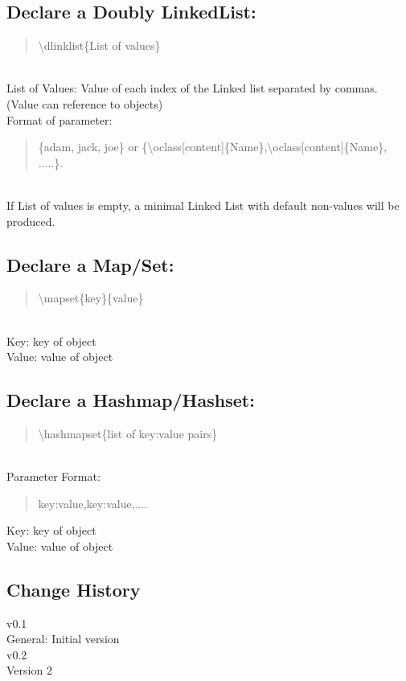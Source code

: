 \documentclass[10pt,a4paper,english]{article}
\begin{document}
\begin{flushleft}
\subsection*{Declare a Doubly LinkedList:}
\begin{quote}{\ttfamily \raggedright \noindent
{\textbackslash}dlinklist{\{}List of values{\}} 
}\end{quote}
~\\ \medskip
List of Values: Value of each index of the Linked list separated by commas. (Value can reference to objects) 
~\\ \medskip
Format of parameter:
~\\
\begin{quote}{\ttfamily \raggedright \noindent
{\{}adam, jack, joe{\}} or {\{}{\textbackslash}oclass[content]{\{}Name{\}},{\textbackslash}oclass[content]{\{}Name{\}}, .....{\}}. 
}\end{quote}
~\\
If List of values is empty, a minimal Linked List with default non-values will be produced.

\subsection*{Declare a Map/Set:}
\begin{quote}{\ttfamily \raggedright \noindent
{\textbackslash}mapset{\{}key{\}}{\{}value{\}} 
}\end{quote}
~\\ \medskip
Key:  key of object ~\\
Value: value of object ~\\

\subsection*{Declare a Hashmap/Hashset:}
\begin{quote}{\ttfamily \raggedright \noindent
{\textbackslash}hashmapset{\{}list of key:value pairs{\}}
}\end{quote}
~\\ \medskip
Parameter Format:~\\ \medskip
\begin{quote}{\ttfamily \raggedright \noindent
{ {key:value},{key:value},....}
}\end{quote}
Key:  key of object ~\\
Value: value of object ~\\

\end{flushleft}

\newpage
\begin{multicols}{2} %

\section*{Change History}
v0.1\\
\indent General: Initial version  \\
v0.2\\
\indent Version 2 
\end{multicols}
\end{document}

